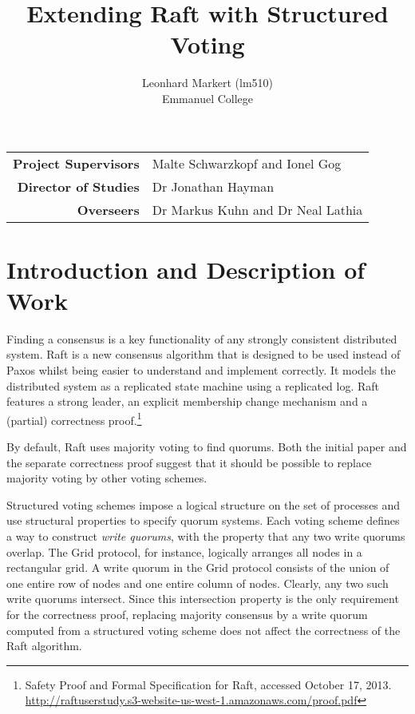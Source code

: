 \documentclass[12pt]{scrartcl}
\title{Extending Raft with Structured Voting}
\author{Leonhard Markert (lm510) \\ Emmanuel College}
\date{}
\begin{document}
\maketitle

\begin{center}
\begin{tabularx}{350pt}{rX}
\textbf{Project Supervisors} & Malte Schwarzkopf and Ionel Gog \\
\textbf{Director of Studies} & Dr Jonathan Hayman \\
\textbf{Overseers} & Dr Markus Kuhn and Dr Neal Lathia \\
\end{tabularx}
\end{center}

\newpage

\section{Introduction and Description of Work%
  \label{introduction-and-description-of-work}%
}

Finding a consensus is a key functionality of any strongly consistent distributed system. Raft \cite{raft} is a new consensus algorithm that is designed to be used instead of Paxos \cite{paxos} whilst being easier to understand and implement correctly. It models the distributed system as a replicated state machine using a replicated log. Raft features a strong leader, an explicit membership change mechanism and a (partial) correctness proof.\footnote{Safety Proof and Formal Specification for Raft, accessed October 17, 2013. \url{http://raftuserstudy.s3-website-us-west-1.amazonaws.com/proof.pdf}}

By default, Raft uses majority voting to find quorums. Both the initial paper and the separate correctness proof suggest that it should be possible to replace majority voting by other voting schemes.

Structured voting schemes \cite{voting} impose a logical structure on the set of processes and use structural properties to specify quorum systems. Each voting scheme defines a way to construct \emph{write quorums}, with the property that any two write quorums overlap. The Grid protocol, for instance, logically arranges all nodes in a rectangular grid. A write quorum in the Grid protocol consists of the union of one entire row of nodes and one entire column of nodes. Clearly, any two such write quorums intersect. Since this intersection property is the only requirement for the correctness proof, replacing majority consensus by a write quorum computed from a structured voting scheme does not affect the correctness of the Raft algorithm.
\end{document}
